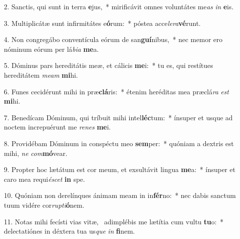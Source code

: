 2. Sanctis, qui sunt in terra \textbf{e}jus,~*  mirificávit omnes voluntátes me\textit{as} \textit{in} \textbf{e}is.\

3. Multiplicátæ sunt infirmitátes e\textbf{ó}rum:~*  póstea acce\textit{le}\textit{ra}\textbf{vé}runt.\

4. Non congregábo conventícula eórum de san\textbf{guí}nibus,~*  nec memor ero nóminum eórum per lá\textit{bi}\textit{a} \textbf{me}a.\

5. Dóminus pars hereditátis meæ, et cálicis \textbf{me}i:~*  tu es, qui restítues hereditátem \textit{me}\textit{am} \textbf{mi}hi.\

6. Funes cecidérunt mihi in præ\textbf{clá}ris:~*  étenim heréditas mea præclá\textit{ra} \textit{est} \textbf{mi}hi.\

7. Benedícam Dóminum, qui tríbuit mihi intel\textbf{léc}tum:~*  ínsuper et usque ad noctem increpuérunt me \textit{re}\textit{nes} \textbf{me}i.\

8. Providébam Dóminum in conspéctu meo \textbf{sem}per:~*  quóniam a dextris est mihi, \textit{ne} \textit{com}\textbf{mó}vear.\

9. Propter hoc lætátum est cor meum, et exsultávit lingua \textbf{me}a:~*  ínsuper et caro mea requi\textit{é}\textit{scet} \textbf{in} spe.\

10. Quóniam non derelínques ánimam meam in in\textbf{fér}no:~*  nec dabis sanctum tuum vidére cor\textit{rup}\textit{ti}\textbf{ó}nem.\

11. Notas mihi fecísti vias vitæ, \dag\  adimplébis me lætítia cum vultu \textbf{tu}o:~*  delectatiónes in déxtera tua us\textit{que} \textit{in} \textbf{fi}nem.\

